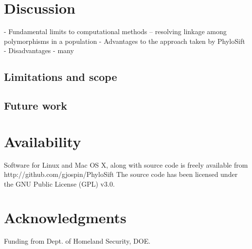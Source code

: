 \documentclass[10pt]{article}
\begin{document}
\section*{Discussion}
  - Fundamental limits to computational methods -- resolving linkage among polymorphisms in a population
  - Advantages to the approach taken by PhyloSift
  - Disadvantages
    - many


\subsection*{Limitations and scope}


\subsection*{Future work}


\section*{Availability}
Software for Linux and Mac OS X, along with source code is freely available from http://github.com/gjospin/PhyloSift
The source code has been licensed under the GNU Public License (GPL) v3.0.

\section*{Acknowledgments}
Funding from Dept. of Homeland Security, DOE.



\clearpage
\end{document}

